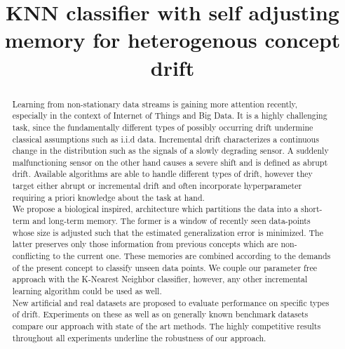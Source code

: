 \documentclass[conference]{IEEEtran}
\begin{document}
\title{KNN classifier with self adjusting memory for heterogenous concept drift }


\author{
}



\maketitle



\begin{abstract}
Learning from non-stationary data streams is gaining more attention
recently, especially in the context of Internet of Things and Big Data.
It is a highly challenging task, since the fundamentally different types
of possibly occurring drift undermine classical assumptions such as
i.i.d data. Incremental drift characterizes a continuous change in the
distribution such as the signals of a slowly degrading sensor. A
suddenly malfunctioning sensor on the other hand causes a severe shift
and is defined as abrupt drift. Available algorithms are able to handle
different types of drift, however they target either abrupt or
incremental drift and often incorporate hyperparameter requiring a
priori knowledge about the task at hand.\\
We propose a biological inspired, architecture which partitions the data
into a short-term and long-term memory. The former is a window of
recently seen data-points whose size is adjusted such that the estimated
generalization error is minimized. The latter preserves only those
information from previous concepts which are non-conflicting to the
current one. These memories are combined according to the demands of the
present concept to classify unseen data points. We couple our parameter
free approach with the K-Nearest Neighbor classifier, however, any other
incremental learning algorithm could be used as well. \\
New artificial and real datasets are proposed to evaluate performance on
specific types of drift. Experiments on these as well as on generally
known benchmark datasets compare our approach with state of the art
methods. The highly competitive results throughout all experiments
underline the robustness of our approach.
\end{abstract}
\end{document}
